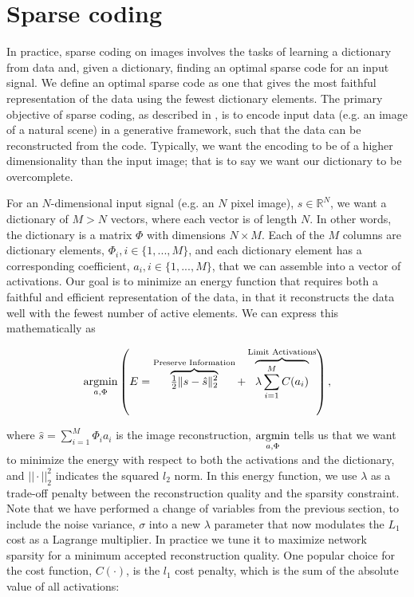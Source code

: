 \section{Sparse coding}
In practice, sparse coding on images involves the tasks of learning a dictionary from data and, given a dictionary, finding an optimal sparse code for an input signal. We define an optimal sparse code as one that gives the most faithful representation of the data using the fewest dictionary elements. The primary objective of sparse coding, as described in \parencite{olshausen1997sparse}, is to encode input data (e.g. an image of a natural scene) in a generative framework, such that the data can be reconstructed from the code. Typically, we want the encoding to be of a higher dimensionality than the input image; that is to say we want our dictionary to be overcomplete.

For an $N$-dimensional input signal (e.g. an $N$ pixel image), $s \in \mathbb{R}^{N}$, we want a dictionary of $M > N$ vectors, where each vector is of length $N$. In other words, the dictionary is a matrix $\Phi$ with dimensions $N \times M$. Each of the $M$ columns are dictionary elements, $\Phi_{i}, i \in \{1,...,M\}$, and each dictionary element has a corresponding coefficient, $a_{i}, i \in \{1,...,M\}$, that we can assemble into a vector of activations. Our goal is to minimize an energy function that requires both a faithful and efficient representation of the data, in that it reconstructs the data well with the fewest number of active elements. We can express this mathematically as

\begin{equation}\label{eq:ch2_sparse_energy}
    \argmin\limits_{a, \Phi}
        \left( E =
            \overbrace{ \tfrac{1}{2} \| s - \hat{s} \|_{2}^{2} }^\text{Preserve Information} +
        \overbrace{ \lambda \sum\limits_{i=1}^{M}C(a_{i}) }^\text{Limit Activations} \right),
\end{equation}

\noindent where $\hat{s} = \sum\limits_{i=1}^{M}\Phi_{i}a_{i}$ is the image reconstruction, $\argmin\limits_{a, \Phi}$ tells us that we want to minimize the energy with respect to both the activations and the dictionary, and $||\cdot||_2^2$ indicates the squared $l_2$ norm. In this energy function, we use $\lambda$ as a trade-off penalty between the reconstruction quality and the sparsity constraint. Note that we have performed a change of variables from the previous section, to include the noise variance, $\sigma$ into a new $\lambda$ parameter that now modulates the $L_{1}$ cost as a Lagrange multiplier. In practice we tune it to maximize network sparsity for a minimum accepted reconstruction quality. One popular choice for the cost function, $C(\cdot)$, is the $l_1$ cost penalty, which is the sum of the absolute value of all activations:

